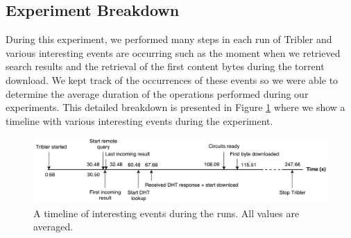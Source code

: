 \subsection{Experiment Breakdown}
During this experiment, we performed many steps in each run of Tribler and various interesting events are occurring such as the moment when we retrieved search results and the retrieval of the first content bytes during the torrent download. We kept track of the occurrences of these events so we were able to determine the average duration of the operations performed during our experiments. This detailed breakdown is presented in Figure \ref{fig:big-experiment-breakdown} where we show a timeline with various interesting events during the experiment.

\begin{figure}[!h]
	\centering
	\includegraphics[width=1.0\columnwidth]{images/big_experiment/big_experiment_breakdown}
	\caption{A timeline of interesting events during the runs. All values are averaged.}
	\label{fig:big-experiment-breakdown}
\end{figure}

